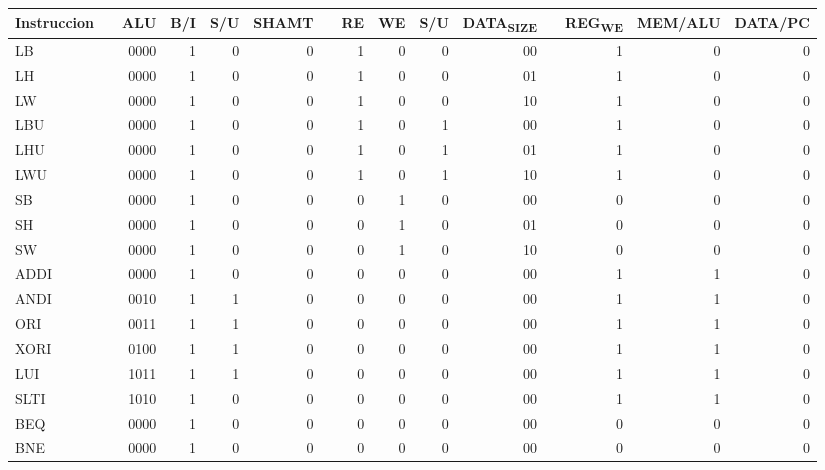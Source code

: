 \documentclass[11pt]{article}
\begin{document}
\begin{enumerate}
\begin{center}
\begin{tabular}{llrrrrlrrrrlrrr}
Instruccion &  & ALU & B/I & S/U & SHAMT &  & RE & WE & S/U & DATA\textsubscript{SIZE} &  & REG\textsubscript{WE} & MEM/ALU & DATA/PC\\
\hline
LB &  & 0000 & 1 & 0 & 0 &  & 1 & 0 & 0 & 00 &  & 1 & 0 & 0\\
LH &  & 0000 & 1 & 0 & 0 &  & 1 & 0 & 0 & 01 &  & 1 & 0 & 0\\
LW &  & 0000 & 1 & 0 & 0 &  & 1 & 0 & 0 & 10 &  & 1 & 0 & 0\\
LBU &  & 0000 & 1 & 0 & 0 &  & 1 & 0 & 1 & 00 &  & 1 & 0 & 0\\
LHU &  & 0000 & 1 & 0 & 0 &  & 1 & 0 & 1 & 01 &  & 1 & 0 & 0\\
LWU &  & 0000 & 1 & 0 & 0 &  & 1 & 0 & 1 & 10 &  & 1 & 0 & 0\\
SB &  & 0000 & 1 & 0 & 0 &  & 0 & 1 & 0 & 00 &  & 0 & 0 & 0\\
SH &  & 0000 & 1 & 0 & 0 &  & 0 & 1 & 0 & 01 &  & 0 & 0 & 0\\
SW &  & 0000 & 1 & 0 & 0 &  & 0 & 1 & 0 & 10 &  & 0 & 0 & 0\\
ADDI &  & 0000 & 1 & 0 & 0 &  & 0 & 0 & 0 & 00 &  & 1 & 1 & 0\\
ANDI &  & 0010 & 1 & 1 & 0 &  & 0 & 0 & 0 & 00 &  & 1 & 1 & 0\\
ORI &  & 0011 & 1 & 1 & 0 &  & 0 & 0 & 0 & 00 &  & 1 & 1 & 0\\
XORI &  & 0100 & 1 & 1 & 0 &  & 0 & 0 & 0 & 00 &  & 1 & 1 & 0\\
LUI &  & 1011 & 1 & 1 & 0 &  & 0 & 0 & 0 & 00 &  & 1 & 1 & 0\\
SLTI &  & 1010 & 1 & 0 & 0 &  & 0 & 0 & 0 & 00 &  & 1 & 1 & 0\\
BEQ &  & 0000 & 1 & 0 & 0 &  & 0 & 0 & 0 & 00 &  & 0 & 0 & 0\\
BNE &  & 0000 & 1 & 0 & 0 &  & 0 & 0 & 0 & 00 &  & 0 & 0 & 0\\
\end{tabular}
\end{center}
\end{enumerate}
\end{document}
